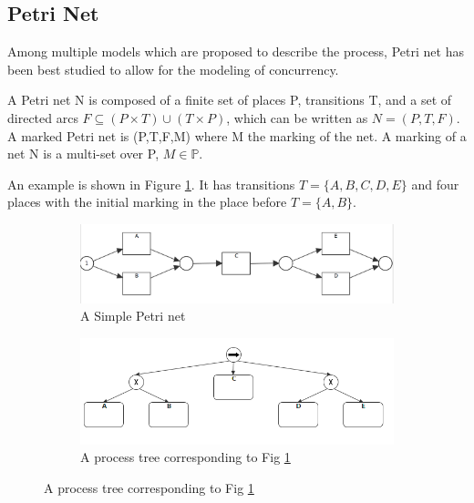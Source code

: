 \subsection{Petri Net}
Among multiple models which are proposed to describe the process, Petri net has been best studied to allow for the modeling of concurrency. 
\begin{definition}
	A Petri net N is composed of a finite set of places P, transitions T, and a set of directed arcs $F \subseteq (P \times T) \cup (T \times P)$, which can be written as $N=(P,T,F)$. A marked Petri net is (P,T,F,M) where M the marking of the net. A marking of a net N is a multi-set over P, $M \in \mathbb{P} $. 
\end{definition}
An example is shown in Figure \ref{fig:pn-seq-2}. It has transitions $T=\{A,B,C,D,E\}$ and four places with the initial marking in the place before $T=\{A,B\}$. 
\begin{figure}[!h]
	\centering
	\begin{subfigure}[b]{0.45\textwidth}
		\centering
		\includegraphics[width=\linewidth]{figures/preliminary/PN06_Seq_2_xor_notnested.png}
		\caption{A Simple Petri net}
		\label{fig:pn-seq-2}
	\end{subfigure}%
	\quad
	\begin{subfigure}[b]{0.45\textwidth}
		\centering
		\includegraphics[width=\linewidth]{figures/preliminary/PT06_Seq_2_xor_notnested.png}
		\caption{A process tree corresponding to Fig \ref{fig:pn-seq-2}}
		\label{fig:pt-seq-2}
	\end{subfigure}%
\end{figure}
